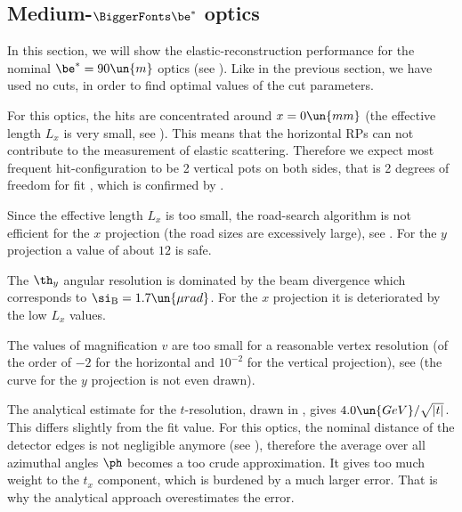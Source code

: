\def\OutlineLabel{Medium-beta* optics}
\def\TOCLabel{Medium-$\be^*$ optics}
\subsection[elr 90]{Medium-$\BiggerFonts\mathbf\be^*$ optics}

In this section, we will show the elastic-reconstruction performance for the nominal $\be^* = 90\un{m}$ optics (see ). Like in the previous section, we have used no cuts, in order to find optimal values of the cut parameters.

For this optics, the hits are concentrated around $x=0\un{mm}$ (the effective length $L_x$ is very small, see ). This means that the horizontal RPs can not contribute to the measurement of elastic scattering. Therefore we expect most frequent hit-configuration to be 2 vertical pots on both sides, that is 2 degrees of freedom for fit , which is confirmed by .

Since the effective length $L_x$ is too small, the road-search algorithm is not efficient for the $x$ projection (the road sizes are excessively large), see . For the $y$ projection a value of about $12$ is safe.

\bmfig
{}
\emfig

The $\th_y$ angular resolution is dominated by the beam divergence which corresponds to $\si_{\rm B} = 1.7\un{\mu rad}$. For the $x$ projection it is deteriorated by the low $L_x$ values.

The values of magnification $v$ are too small for a reasonable vertex resolution (of the order of $-2$ for the horizontal and $10^{-2}$ for the vertical projection), see  (the curve for the $y$ projection is not even drawn).

\bmfig
{}
\emfig

The analytical estimate  for the $t$-resolution, drawn in , gives $4.0\un{GeV}/\sqrt{|t|}$. This differs slightly from the fit value. For this optics, the nominal distance of the detector edges is not negligible anymore (see ), therefore the average over all azimuthal angles $\ph$ becomes a too crude approximation. It gives too much weight to the $t_x$ component, which is burdened by a much larger error. That is why the analytical approach overestimates the error.

